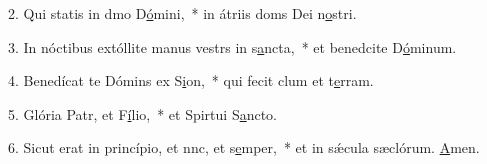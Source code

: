 2. Qui statis in dmo D\uline{ó}mini,~* in átriis doms Dei n\uline{o}stri.\par 
3. In nóctibus extóllite manus vestrs in s\uline{a}ncta,~* et benedcite D\uline{ó}minum.\par 
4. Benedícat te Dómins ex S\uline{i}on,~* qui fecit clum et t\uline{e}rram.\par 
5. Glória Patr, et F\uline{í}lio,~* et Spirtui S\uline{a}ncto.\par 
6. Sicut erat in princípio, et nnc, et s\uline{e}mper,~* et in sǽcula sæclórum. \uline{A}men.\par 
